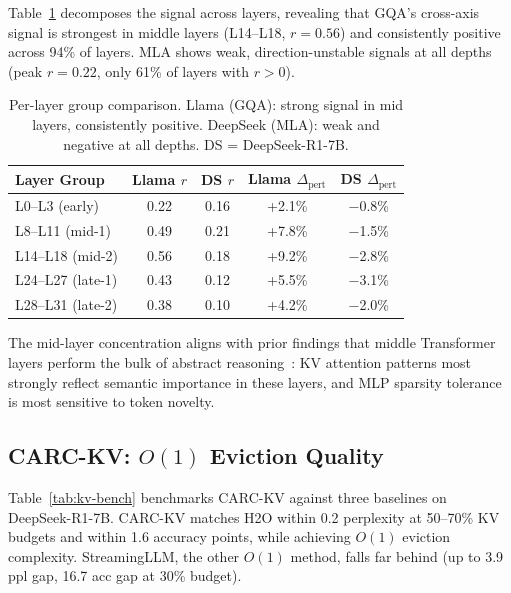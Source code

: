 \documentclass[11pt,a4paper]{article}
\begin{document}
Table~\ref{tab:per-layer} decomposes the signal across layers, revealing that GQA's cross-axis signal is strongest in middle layers (L14--L18, $r = 0.56$) and consistently positive across 94\% of layers.
MLA shows weak, direction-unstable signals at all depths (peak $r = 0.22$, only 61\% of layers with $r > 0$).

\begin{table}[t]
\centering
\small
\begin{tabular}{lcccc}
\toprule
\textbf{Layer Group} & \textbf{Llama $r$} & \textbf{DS $r$} & \textbf{Llama $\Delta_\text{pert}$} & \textbf{DS $\Delta_\text{pert}$} \\
\midrule
L0--L3 (early)   & 0.22 & 0.16 & +2.1\% & $-$0.8\% \\
L8--L11 (mid-1)  & 0.49 & 0.21 & +7.8\% & $-$1.5\% \\
L14--L18 (mid-2) & 0.56 & 0.18 & +9.2\% & $-$2.8\% \\
L24--L27 (late-1) & 0.43 & 0.12 & +5.5\% & $-$3.1\% \\
L28--L31 (late-2) & 0.38 & 0.10 & +4.2\% & $-$2.0\% \\
\bottomrule
\end{tabular}
\caption{Per-layer group comparison. Llama (GQA): strong signal in mid layers, consistently positive. DeepSeek (MLA): weak and negative at all depths. DS = DeepSeek-R1-7B.}
\label{tab:per-layer}
\end{table}

The mid-layer concentration aligns with prior findings that middle Transformer layers perform the bulk of abstract reasoning~\cite{geva2023dissecting}: KV attention patterns most strongly reflect semantic importance in these layers, and MLP sparsity tolerance is most sensitive to token novelty.

\subsection{CARC-KV: $O(1)$ Eviction Quality}
\label{sec:kv-bench}

Table~\ref{tab:kv-bench} benchmarks CARC-KV against three baselines on DeepSeek-R1-7B.
CARC-KV matches H2O within 0.2 perplexity at 50--70\% KV budgets and within 1.6 accuracy points, while achieving $O(1)$ eviction complexity.
StreamingLLM, the other $O(1)$ method, falls far behind (up to 3.9 ppl gap, 16.7 acc gap at 30\% budget).
\end{document}
